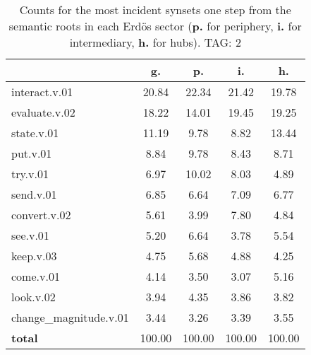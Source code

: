 \begin{table}[h!]
\begin{center}
\begin{tabular}{| l || c | c | c | c |}\hline
 & {\bf g.} & {\bf p.} & {\bf i.} & {\bf h.} \\\hline\hline
interact.v.01 & 20.84  & 22.34  & 21.42  & 19.78 \\\hline
evaluate.v.02 & 18.22  & 14.01  & 19.45  & 19.25 \\\hline
state.v.01 & 11.19  & 9.78  & 8.82  & 13.44 \\\hline
put.v.01 & 8.84  & 9.78  & 8.43  & 8.71 \\\hline
try.v.01 & 6.97  & 10.02  & 8.03  & 4.89 \\\hline
send.v.01 & 6.85  & 6.64  & 7.09  & 6.77 \\\hline
convert.v.02 & 5.61  & 3.99  & 7.80  & 4.84 \\\hline
see.v.01 & 5.20  & 6.64  & 3.78  & 5.54 \\\hline
keep.v.03 & 4.75  & 5.68  & 4.88  & 4.25 \\\hline
come.v.01 & 4.14  & 3.50  & 3.07  & 5.16 \\\hline
look.v.02 & 3.94  & 4.35  & 3.86  & 3.82 \\\hline
change\_magnitude.v.01 & 3.44  & 3.26  & 3.39  & 3.55 \\\hline\hline
{{\bf total}} & 100.00  & 100.00  & 100.00  & 100.00 \\\hline
\end{tabular}
\caption{Counts for the most incident synsets one step from the semantic roots in each Erd\"os sector ({\bf p.} for periphery, {\bf i.} for intermediary, {\bf h.} for hubs). TAG: 2}
\end{center}
\end{table}